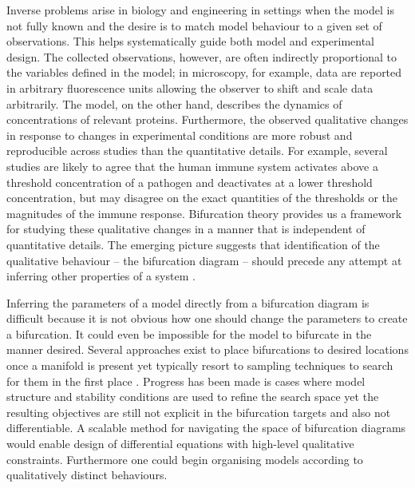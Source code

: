 Inverse problems \cite{Abdulla2009InverseBiology} arise in biology and engineering in settings when the model is not fully known and the desire is to match model behaviour to a given set of observations. This helps systematically guide both model and experimental design. The collected observations, however, are often indirectly proportional to the variables defined in the model; in microscopy, for example, data are reported in arbitrary fluorescence units allowing the observer to shift and scale data arbitrarily. The model, on the other hand, describes the dynamics of concentrations of relevant proteins. Furthermore, the observed qualitative changes in response to changes in experimental conditions are more robust and reproducible across studies than the quantitative details. For example, several studies are likely to agree that the human immune system activates above a threshold concentration of a pathogen and deactivates at a lower threshold concentration, but may disagree on the exact quantities of the thresholds or the magnitudes of the immune response. Bifurcation theory provides us a framework for studying these qualitative changes in a manner that is independent of quantitative details. The emerging picture suggests that identification of the qualitative behaviour -- the bifurcation diagram -- should precede any attempt at inferring other properties of a system \cite{Stumpf2019ParameterBifurcations}.

Inferring the parameters of a model directly from a bifurcation diagram is difficult because it is not obvious how one should change the parameters to create a bifurcation. It could even be impossible for the model to bifurcate in the manner desired. Several approaches exist to place bifurcations to desired locations once a manifold is present \cite{Iwasaki1997AnType,Lu2006InverseSystems,Dobson2004DistanceBifurcations} yet typically resort to sampling techniques to search for them in the first place \cite{Chickarmane2005BifurcationTool,Conrad2006BifurcationClock}. Progress has been made is cases where model structure and stability conditions are used to refine the search space \cite{Otero-Muras2018Optimization-basedModels,Otero-Muras2014ACurves} yet the resulting objectives are still not explicit in the bifurcation targets and also not differentiable. A scalable method for navigating the space of bifurcation diagrams would enable design of differential equations with high-level qualitative constraints. Furthermore one could begin organising models according to qualitatively distinct behaviours.

